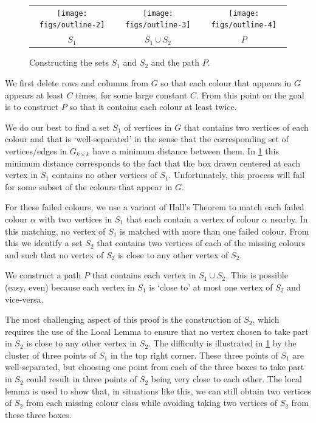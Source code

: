 \documentclass{patmorin}
\begin{document}
\begin{figure}
  \begin{center}
    \begin{tabular}{ccc}
      \texttt{[image: figs/outline-2]} &
      \texttt{[image: figs/outline-3]} &
      \texttt{[image: figs/outline-4]} \\
      $S_1$ & $S_1\cup S_2$ & $P$
    \end{tabular}
  \end{center}
  \caption{Constructing the sets $S_1$ and $S_2$ and the path $P$.}
  \label{outline}
\end{figure}
\begin{compactenum}
  
  \item We first delete rows and columns from $G$ so that each colour that appears in $G$ appears at least $C$ times, for some large constant $C$.  From this point on the goal is to construct $P$ so that it contains each colour at least twice.
  
  \item We do our best to find a set $S_1$ of vertices in $G$ that contains two vertices of each colour and that is `well-separated' in the sense that the corresponding set of vertices/edges in $G_{k\times k}$ have a minimum distance between them.  In \cref{outline} this minimum distance corresponds to the fact that the box drawn centered at each vertex in $S_1$ contains no other vertices of $S_1$. 
  Unfortunately, this process will fail for some subset of the colours that appear in $G$.
  
  \item For these failed colours, we use a variant of Hall's Theorem to match each failed colour $\alpha$ with two vertices in $S_1$ that each contain a vertex of colour $\alpha$ nearby.  In this matching, no vertex of $S_1$ is matched with more than one failed colour.  From this we identify a set $S_2$ that contains two vertices of each of the missing colours and such that no vertex of $S_2$ is close to any other vertex of $S_2$.
    
  \item We construct a path $P$ that contains each vertex in $S_1\cup S_2$.  This is possible (easy, even) because each vertex in $S_1$ is `close to' at most one vertex of $S_2$ and vice-versa.
\end{compactenum}

The most challenging aspect of this proof is the construction of $S_2$, which requires the use of the Local Lemma to ensure that no vertex chosen to take part in $S_2$ is close to any other vertex in $S_2$.  The difficulty is illustrated in \cref{outline} by the cluster of three points of $S_1$ in the top right corner.  These three points of $S_1$ are well-separated, but choosing one point from each of the three boxes to take part in $S_2$ could result in three points of $S_2$ being very close to each other.  The local lemma is used to show that, in situations like this, we can still obtain two vertices of $S_2$ from each missing colour class while avoiding taking two vertices of $S_2$ from these three boxes.
\end{document}

